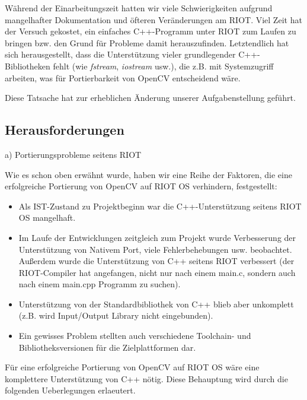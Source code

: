 \documentclass[10pt,a4paper]{article}
\begin{document}
Während der Einarbeitungszeit hatten wir viele Schwierigkeiten aufgrund mangelhafter Dokumentation und öfteren Veränderungen am RIOT. Viel Zeit hat der Versuch gekostet, ein einfaches C++-Programm unter RIOT zum Laufen zu bringen bzw. den Grund für Probleme damit herauszufinden. Letztendlich hat sich herausgestellt, dass die Unterstützung vieler grundlegender C++-Bibliotheken fehlt (wie {\it fstream}, {\it iostream} usw.), die z.B. mit Systemzugriff arbeiten, was für Portierbarkeit von OpenCV entscheidend wäre. \newline

Diese Tatsache hat zur erheblichen Änderung unserer Aufgabenstellung geführt.

\subsection{Herausforderungen}

a) Portierungsprobleme seitens RIOT \newline

Wie es schon oben erwähnt wurde, haben wir eine Reihe der Faktoren, die eine erfolgreiche Portierung von OpenCV auf RIOT OS verhindern, festgestellt:

\begin{itemize}
\item Als IST-Zustand zu Projektbeginn war die C++-Unterstützung seitens RIOT OS mangelhaft.
\item Im Laufe der Entwicklungen zeitgleich zum Projekt wurde Verbesserung der Unterstützung von Nativem Port, viele Fehlerbehebungen usw. beobachtet. Außerdem wurde die Unterstützung von C++ seitens RIOT verbessert (der RIOT-Compiler hat angefangen, nicht nur nach einem main.c, sondern auch nach einem main.cpp Programm zu suchen). 
\item Unterstützung von der Standardbibliothek von C++ blieb aber unkomplett (z.B. wird Input/Output Library nicht eingebunden).
\item Ein gewisses Problem stellten auch verschiedene Toolchain- und Bibliotheksversionen für die Zielplattformen dar.
\end{itemize}

Für eine erfolgreiche Portierung von OpenCV auf RIOT OS wäre eine komplettere Unterstützung von C++ nötig. Diese Behauptung wird durch die folgenden Ueberlegungen erlaeutert. \newline
\end{document}
